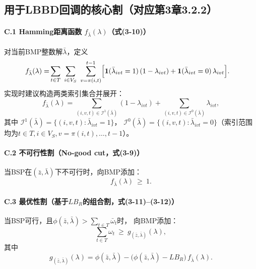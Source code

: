 \documentclass{article}
\begin{document}
\subsection{用于LBBD回调的核心割（对应第3章3.2.2）}

\paragraph{C.1 Hamming距离函数 $f_{\bar\lambda}(\lambda)$（式(3-10)）}
对当前BMP整数解$\bar\lambda$，定义
\begin{align}
f_{\bar\lambda}(\lambda)
=&\sum_{t\in T}\ \sum_{i\in V_S}\ \sum_{v=\pi(i,t)}^{t-1}\Bigl[
\mathbf{1}(\bar\lambda_{ivt}=1)\,(1-\lambda_{ivt})
+
\mathbf{1}(\bar\lambda_{ivt}=0)\,\lambda_{ivt}
\Bigr]. \label{eq:flambda_def}
\end{align}
实现时建议构造两类索引集合并展开：
\[
f_{\bar\lambda}(\lambda)=
\sum_{(i,v,t)\in\mathcal I^1(\bar\lambda)} (1-\lambda_{ivt})
+
\sum_{(i,v,t)\in\mathcal I^0(\bar\lambda)} \lambda_{ivt},
\]
其中
$\mathcal I^1(\bar\lambda)=\{(i,v,t):\bar\lambda_{ivt}=1\}$，
$\mathcal I^0(\bar\lambda)=\{(i,v,t):\bar\lambda_{ivt}=0\}$（索引范围均为$t\in T,i\in V_S,v=\pi(i,t),\ldots,t-1$）。

\paragraph{C.2 不可行性割（No-good cut，式(3-9)）}
当BSP在$(\bar z,\bar\lambda)$下不可行时，向BMP添加：
\begin{equation}
f_{\bar\lambda}(\lambda)\ \ge\ 1.
\label{eq:nogood_feas_39}
\end{equation}

\paragraph{C.3 最优性割（基于$LB_R$的组合割，式(3-11)--(3-12)）}
当BSP可行，且$\phi(\bar z,\bar\lambda)>\sum_{t\in T}\bar\omega_t$时，
向BMP添加：
\begin{equation}
\sum_{t\in T}\omega_t\ \ge\ g_{(\bar z,\bar\lambda)}(\lambda),
\label{eq:opt_g_311}
\end{equation}
其中
\begin{equation}
g_{(\bar z,\bar\lambda)}(\lambda)
=\phi(\bar z,\bar\lambda)
-\bigl(\phi(\bar z,\bar\lambda)-LB_R\bigr)\,f_{\bar\lambda}(\lambda).
\label{eq:g_def_312}
\end{equation}
\end{document}
